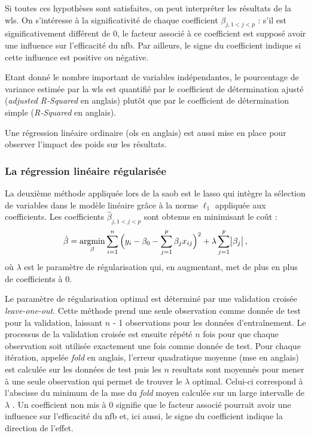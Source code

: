 Si toutes ces hypothèses sont satisfaites, on peut interpréter les résultats de la \gls{wls}. On s'intéresse à la significativité de chaque coefficient $\beta_{j, 1<j<p}$ :
s'il est significativement différent de 0, le facteur associé à ce coefficient est supposé avoir une influence sur l'efficacité du \gls{nfb}. Par ailleurs, le signe du coefficient indique si 
cette influence est positive ou négative. 

Etant donné le nombre important de variables indépendantes, le pourcentage de variance estimée par la \gls{wls} est quantifié par le coefficient de 
détermination ajusté (\textit{adjusted R-Squared} en anglais) plutôt que par le coefficient de détermination simple (\textit{R-Squared} en anglais).

Une régression linéaire ordinaire (\gls{ols} en anglais) est aussi mise en place pour observer l'impact des poids sur les résultats. 

\subsubsection{La régression linéaire régularisée}

La deuxième méthode appliquée lors de la \gls{saob} est le \gls{lasso} qui intègre la sélection de variables dans le modèle linéaire grâce à la norme $\ell_1$ appliquée aux coefficients.
Les coefficients $\hat{\beta}_{j, 1<j<p}$ sont obtenus en minimisant le coût :
\begin{equation}
\label{eq:factors_lasso-minimization}
\hat{\beta} = \operatorname*{argmin}_\beta \sum_{i=1}^{n} \Big(y_i - \beta_{0} - \sum_{j=1}^{p}\beta_{j}x_{ij}\Big)^2 + \lambda \sum_{j=1}^{p}\abs{\beta_{j}},
\end{equation} 
où $\lambda$ est le paramètre de régularisation qui, en augmentant, met de plus en plus de coefficients à 0. 

Le paramètre de régularisation optimal est déterminé par une validation croisée \textit{leave-one-out}. Cette méthode prend une seule observation 
comme donnée de test pour la validation, laissant $n$ - 1 observations pour les données d'entraînement. Le processus de la validation croisée est ensuite répété $n$ fois pour que chaque observation 
soit utilisée exactement une fois comme donnée de test. Pour chaque itération, appelée \textit{fold} en anglais, l'erreur quadratique moyenne (\gls{mse} en anglais) est calculée sur les données de test
puis les $n$ resultats sont moyennés pour mener à une seule observation qui permet de trouver le $\lambda$ optimal. Celui-ci correspond à l'abscisse du minimum de la \gls{mse} 
du \textit{fold} moyen calculée sur un large intervalle de $\lambda$ \citep{James2013}.
Un coefficient non mis à 0 signifie que le facteur associé pourrait avoir une influence sur l'efficacité du \gls{nfb} et, ici aussi, le signe du coefficient indique la direction de l'effet. 

